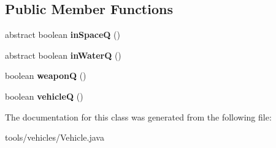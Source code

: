 \subsection*{Public Member Functions}
\begin{DoxyCompactItemize}
\item 
abstract boolean {\bfseries in\+SpaceQ} ()\hypertarget{classtools_1_1vehicles_1_1_vehicle_aac8cb1ada09c2c7341de44f3028b23a4}{}\label{classtools_1_1vehicles_1_1_vehicle_aac8cb1ada09c2c7341de44f3028b23a4}

\item 
abstract boolean {\bfseries in\+WaterQ} ()\hypertarget{classtools_1_1vehicles_1_1_vehicle_aa81ec38679d30de7cccd726789fc1219}{}\label{classtools_1_1vehicles_1_1_vehicle_aa81ec38679d30de7cccd726789fc1219}

\item 
boolean {\bfseries weaponQ} ()\hypertarget{classtools_1_1vehicles_1_1_vehicle_aae18c62f2cc65b2b08801977570cebf4}{}\label{classtools_1_1vehicles_1_1_vehicle_aae18c62f2cc65b2b08801977570cebf4}

\item 
boolean {\bfseries vehicleQ} ()\hypertarget{classtools_1_1vehicles_1_1_vehicle_aec684e1097d2993c9b8c540fe24ecfd9}{}\label{classtools_1_1vehicles_1_1_vehicle_aec684e1097d2993c9b8c540fe24ecfd9}

\end{DoxyCompactItemize}


The documentation for this class was generated from the following file\+:\begin{DoxyCompactItemize}
\item 
tools/vehicles/Vehicle.\+java\end{DoxyCompactItemize}
